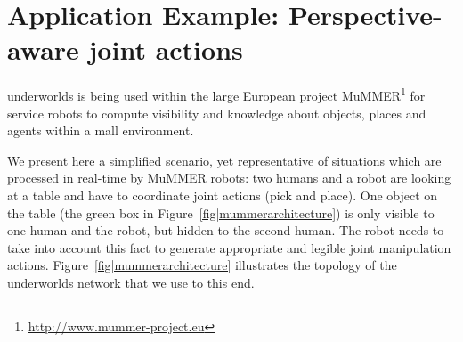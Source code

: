 \documentclass[letterpaper, 10pt, conference]{ieeeconf}
\newcommand{\uwds}{{\sc underworlds}\xspace}
\begin{document}
\section{Application Example: Perspective-aware joint actions}
\label{application}


\uwds is being used within the large European project
MuMMER\footnote{\url{http://www.mummer-project.eu}} for service robots to
compute visibility and knowledge about objects, places and agents within a mall
environment.

We present here a simplified scenario, yet representative of situations which
are processed in real-time by MuMMER robots: two humans and a robot are looking
at a table and have to coordinate joint actions (pick and place).  One object on
the table (the green box in Figure~\ref{fig|mummerarchitecture}) is only visible
to one human and the robot, but hidden to the second human. The robot needs to
take into account this fact to generate appropriate and legible joint
manipulation actions.  Figure~\ref{fig|mummerarchitecture} illustrates the
topology of the \uwds network that we use to this end. 


\end{document}

